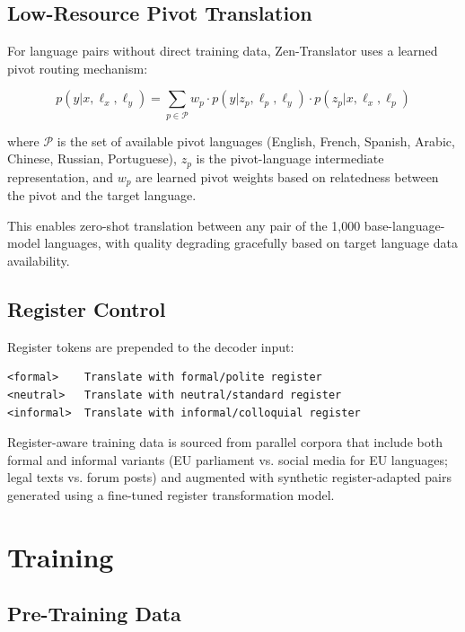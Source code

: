 \documentclass[11pt,a4paper]{article}
\begin{document}
\subsection{Low-Resource Pivot Translation}

For language pairs without direct training data, Zen-Translator uses a learned pivot
routing mechanism:

\begin{equation}
p(y | x, \ell_x, \ell_y) = \sum_{p \in \mathcal{P}} w_p \cdot p(y | z_p, \ell_p, \ell_y) \cdot p(z_p | x, \ell_x, \ell_p)
\end{equation}

where $\mathcal{P}$ is the set of available pivot languages (English, French, Spanish,
Arabic, Chinese, Russian, Portuguese), $z_p$ is the pivot-language intermediate
representation, and $w_p$ are learned pivot weights based on relatedness between
the pivot and the target language.

This enables zero-shot translation between any pair of the 1,000 base-language-model
languages, with quality degrading gracefully based on target language data availability.

\subsection{Register Control}

Register tokens are prepended to the decoder input:
\begin{verbatim}
<formal>    Translate with formal/polite register
<neutral>   Translate with neutral/standard register
<informal>  Translate with informal/colloquial register
\end{verbatim}

Register-aware training data is sourced from parallel corpora that include both formal
and informal variants (EU parliament vs. social media for EU languages; legal texts
vs. forum posts) and augmented with synthetic register-adapted pairs generated using
a fine-tuned register transformation model.

\section{Training}
\label{sec:training}

\subsection{Pre-Training Data}
\end{document}
